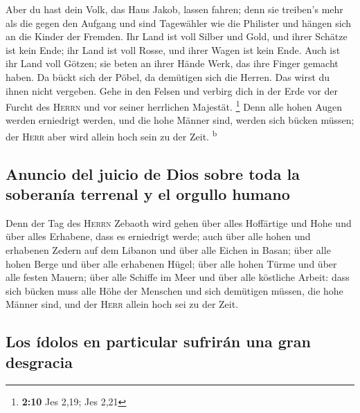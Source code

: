  Aber du hast dein Volk, das Haus Jakob, lassen fahren;
denn sie treiben's mehr als die gegen den Aufgang und sind Tagewähler
wie die Philister und hängen sich an die Kinder der Fremden.
 Ihr Land ist voll Silber und Gold, und ihrer Schätze ist
kein Ende; ihr Land ist voll Rosse, und ihrer Wagen ist kein Ende.
 Auch ist ihr Land voll Götzen; sie beten an ihrer Hände
Werk, das ihre Finger gemacht haben.  Da bückt sich der
Pöbel, da demütigen sich die Herren. Das wirst du ihnen nicht vergeben.
 Gehe in den Felsen und verbirg dich in der Erde vor der
Furcht des \textsc{Herrn} und vor seiner herrlichen Majestät.
\footnote{\textbf{2:10} Jes 2,19; Jes 2,21}  Denn alle
hohen Augen werden erniedrigt werden, und die hohe Männer sind, werden
sich bücken müssen; der \textsc{Herr} aber wird allein hoch sein zu der
Zeit. \textsuperscript{b}

\hypertarget{anuncio-del-juicio-de-dios-sobre-toda-la-soberanuxeda-terrenal-y-el-orgullo-humano}{%
\subsection{Anuncio del juicio de Dios sobre toda la soberanía terrenal
y el orgullo
humano}\label{anuncio-del-juicio-de-dios-sobre-toda-la-soberanuxeda-terrenal-y-el-orgullo-humano}}

 Denn der Tag des \textsc{Herrn} Zebaoth wird gehen über
alles Hoffärtige und Hohe und über alles Erhabene, dass es erniedrigt
werde;  auch über alle hohen und erhabenen Zedern auf dem
Libanon und über alle Eichen in Basan;  über alle hohen
Berge und über alle erhabenen Hügel;  über alle hohen
Türme und über alle festen Mauern;  über alle Schiffe im
Meer und über alle köstliche Arbeit:  dass sich bücken
muss alle Höhe der Menschen und sich demütigen müssen, die hohe Männer
sind, und der \textsc{Herr} allein hoch sei zu der Zeit.

\hypertarget{los-uxeddolos-en-particular-sufriruxe1n-una-gran-desgracia}{%
\subsection{Los ídolos en particular sufrirán una gran
desgracia}\label{los-uxeddolos-en-particular-sufriruxe1n-una-gran-desgracia}}

